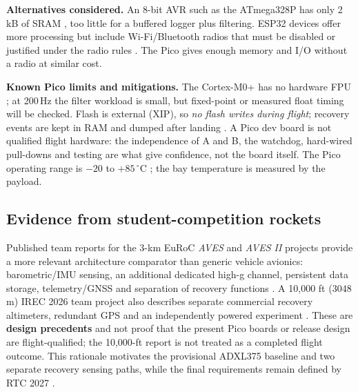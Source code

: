 \textbf{Alternatives considered.} An 8-bit AVR such as the ATmega328P has only 2\,kB of SRAM \cite{atmega328ds}, too little for a buffered logger plus filtering. ESP32 devices offer more processing but include Wi-Fi/Bluetooth radios \cite{esp32ds} that must be disabled or justified under the radio rules \cite{rtc2027app03}. The Pico gives enough memory and I/O without a radio at similar cost.

\textbf{Known Pico limits and mitigations.} The Cortex-M0+ has no hardware FPU \cite{rp2040ds}; at 200\,Hz the filter workload is small, but fixed-point or measured float timing will be checked. Flash is external (XIP), so \emph{no flash writes during flight}; recovery events are kept in RAM and dumped after landing \cite{rp2040ds,picosdk}. A Pico dev board is not qualified flight hardware: the independence of A and B, the watchdog, hard-wired pull-downs and testing are what give confidence, not the board itself. The Pico operating range is $-20$ to $+85\,^{\circ}$C \cite{picods}; the bay temperature is measured by the payload.


\subsection*{Evidence from student-competition rockets}
Published team reports for the 3-km EuRoC \emph{AVES} and \emph{AVES II} projects provide a more relevant architecture comparator than generic vehicle avionics: barometric/IMU sensing, an additional dedicated high-g channel, persistent data storage, telemetry/GNSS and separation of recovery functions \cite{astg2021aves,astg2022aves2}. A 10,000 ft ($3048$ m) IREC 2026 team project also describes separate commercial recovery altimeters, redundant GPS and an independently powered experiment \cite{irec2026sovereignty}. These are \textbf{design precedents} and not proof that the present Pico boards or release design are flight-qualified; the 10,000-ft report is not treated as a completed flight outcome. This rationale motivates the provisional ADXL375 baseline and two separate recovery sensing paths, while the final requirements remain defined by RTC 2027 \cite{rtc2027app03}.


